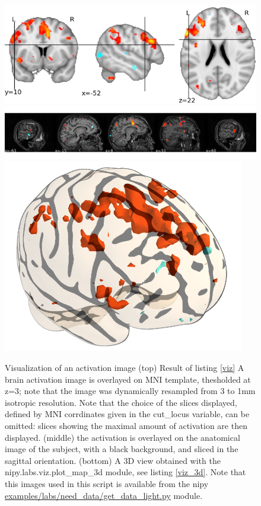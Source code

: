 \documentclass{bioinfo}
\begin{document}
\begin{figure}
\begin{center}
\includegraphics[width=\linewidth]{Figures/ortho_view.png}
\includegraphics[width=\linewidth]{Figures/x_view.png}
\includegraphics[width=.6\linewidth]{Figures/viz_3d.png}
\end{center}
\caption{Visualization of an activation image (top) Result of listing
  \ref{viz} A brain activation image is overlayed on MNI template,
  thesholded at z=3; note that the image was dynamically resampled
  from 3 to 1mm isotropic resolution.  Note that the choice of the
  slices displayed, defined by MNI corrdinates given in the cut\_locus
  variable, can be omitted: slices showing the maximal amount of
  activation are then displayed. (middle) the activation is overlayed
  on the anatomical image of the subject, with a black background, and
  sliced in the sagittal orientation.  (bottom) A 3D view obtained
  with the nipy.labs.viz.plot\_map\_3d module, see listing
  \ref{viz_3d}.  Note that this images used in this script is
  available from the nipy
  \url{examples/labs/need_data/get_data_light.py} module.}
\label{fig:viz}
\end{figure}
\end{document}
